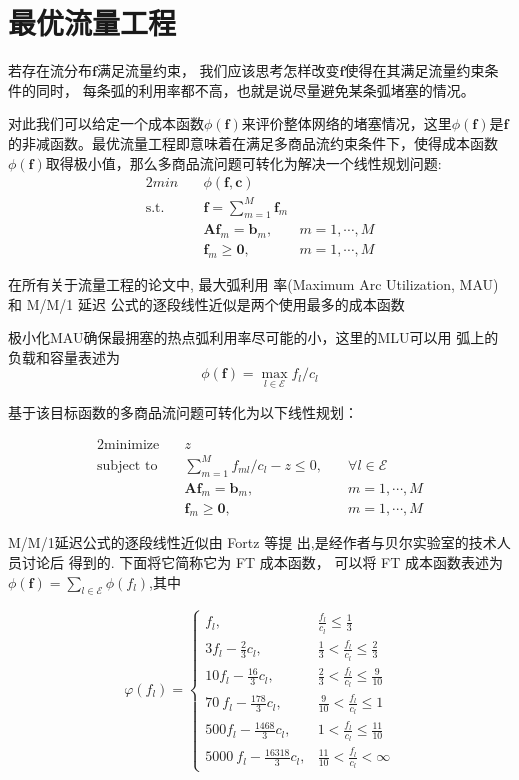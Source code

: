 \documentclass[UTF8]{ctexart}
\begin{document}
\newpage
\section{最优流量工程}
若存在流分布$\bm{f}$满足流量约束，
我们应该思考怎样改变$\bm{f}$使得在其满足流量约束条件的同时，
每条弧的利用率都不高，也就是说尽量避免某条弧堵塞的情况。

对此我们可以给定一个成本函数$\phi(\bm{f})$来评价整体网络的堵塞情况，这里$\phi(\bm{f})$是$\bm{f}$的非减函数。最优流量工程即意味着在满足多商品流约束条件下，使得成本函数$\phi(\bm{f})$取得极小值，那么多商品流问题可转化为解决一个线性规划问题:
\begin{alignat}{2}
min \quad & \phi(\bm{f},\bm{c})&{}\\
\mbox{s.t.}\quad
&\bm{f}=\sum_{m=1}^M \bm{f}_m&{} \\
&\bm{A}\bm{f}_m=\bm{b}_m,\quad &m=1,\cdots,M\\
&\bm{f}_m \geq \bm{0},&m=1,\cdots,M
\end{alignat}

在所有关于流量工程的论文中, 最大弧利用
率(Maximum Arc Utilization, MAU) 和 M/M/1 延迟
公式的逐段线性近似是两个使用最多的成本函数

极小化MAU确保最拥塞的热点弧利用率尽可能的小，这里的MLU可以用
弧上的负载和容量表述为
\begin{equation}
\phi(\bm{f})=\max\limits_{l \in \mathcal{E}}f_l/c_l
\end{equation}


基于该目标函数的多商品流问题可转化为以下线性规划：


\begin{alignat}{2}
\mbox{minimize}\quad &z&{} \nonumber\\
\mbox{subject to}\quad &
\sum_{m=1}^M f_{ml}/c_l-z\leq 0,\quad&\forall l\in \mathcal{E} \nonumber\\
&\bm{A}\bm{f}_m=\bm{b}_m,\quad &m=1,\cdots,M\nonumber\\
&\bm{f}_m \geq \bm{0},&m=1,\cdots,M
\end{alignat}

\newpage
M/M/1延迟公式的逐段线性近似由 Fortz 等提
出,是经作者与贝尔实验室的技术人员讨论后
得到的. 下面将它简称它为 FT 成本函数，
可以将 FT 成本函数表述为$\phi(\bm{f})=\sum_{l \in \mathcal{E}}\phi(f_l)$,其中

\begin{equation}
\varphi(f_{l})=\left\{\begin{array}{ll}
f_{l},& \frac{f_{l}}{c_{l}}\leq\frac{1}{3}\\
3f_{l}-\frac{2}{3}c_{l},& \frac{1}{3}<\frac{f_l}{c_{l}}\leq\frac{2}{3}\\
10f_{l}-\frac{16}{3}c_{l},& \frac{2}{3}<\frac{f_l}{c_{l}}\leq\frac{9}{10}\\
70\ f_{l}-\frac{178}{3}c_{l},& \frac{9}{10}<\frac{f_{l}}{c_{l}}\leq 1\\
500f_{l}-\frac{1468}{3}c_{l},& 1<\frac{f_{l}}{c_{l}}\leq\frac{11}{10}\\
5000\ f_{l}-\frac{16318}{3}c_{l},& \frac{11}{10}<\frac{f_l}{c_{l}}<\infty
\end{array}\right.
\end{equation}
\end{document}
